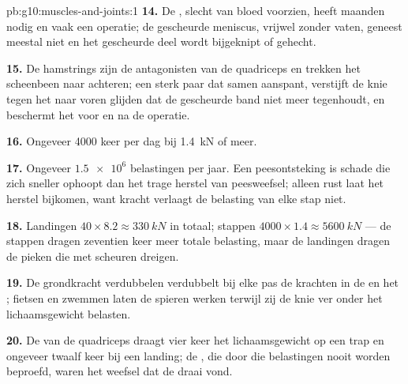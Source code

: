 \begin{solution}{pb:g10:muscles-and-joints:1}
\textbf{14.} De , slecht van bloed voorzien, heeft maanden
nodig en vaak een operatie; de gescheurde meniscus,  vrijwel
zonder vaten, geneest meestal niet en het gescheurde deel wordt
bijgeknipt of gehecht.

\textbf{15.} De hamstrings zijn de antagonisten van de quadriceps en
trekken het scheenbeen naar achteren; een sterk paar dat samen aanspant,
verstijft de knie tegen het naar voren glijden dat de gescheurde band
niet meer tegenhoudt, en beschermt het  voor en na de operatie.

\textbf{16.} Ongeveer 4000 keer per dag bij \qty{1.4}{kN} of meer.

\textbf{17.} Ongeveer $\num{1.5e6}$ belastingen per jaar. Een
peesontsteking is schade die zich sneller ophoopt dan het trage herstel
van peesweefsel; alleen rust laat het herstel bijkomen, want kracht
verlaagt de belasting van elke stap niet.

\textbf{18.} Landingen $40 \times 8.2 \approx \qty{330}{kN}$ in totaal;
stappen $4000 \times 1.4 \approx \qty{5600}{kN}$ --- de stappen dragen
zeventien keer meer totale belasting, maar de landingen dragen de pieken
die met scheuren dreigen.

\textbf{19.} De grondkracht verdubbelen verdubbelt bij elke pas de
krachten in de  en het ; fietsen en zwemmen laten de spieren
werken terwijl zij de knie ver onder het lichaamsgewicht belasten.

\textbf{20.} De  van de quadriceps draagt vier keer het
lichaamsgewicht op een trap en ongeveer twaalf keer bij een landing; de
, die door die belastingen nooit worden beproefd, waren het
weefsel dat de draai vond.
\end{solution}
